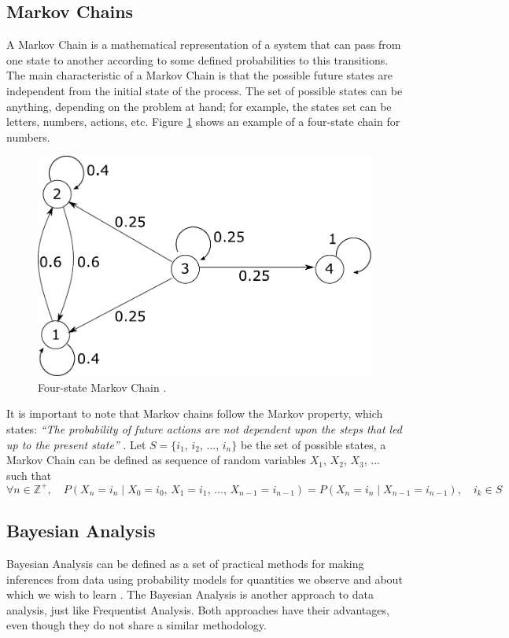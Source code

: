 	\subsection{Markov Chains}
	A Markov Chain is a mathematical representation of a system that can pass from one state to another according to some defined probabilities to this transitions. The main characteristic of a Markov Chain is that the possible future states are independent from the initial state of the process. The set of possible states can be anything, depending on the problem at hand; for example, the states set can be letters, numbers, actions, etc. Figure \ref{img:markov} shows an example of a four-state chain for numbers.
    \begin{figure}[H]
        \centering
        \includegraphics[scale=0.45]{files/Markov.pdf}
        \caption{Four-state Markov Chain \cite{brilliantMarkov}.}
        \label{img:markov}
    \end{figure}
    It is important to note that Markov chains follow the Markov property, which states: \textit{``The probability of future actions are not dependent upon the steps that led up to the present state''} \cite{brilliantMarkov}. Let $S=\{i_1$, $i_2$, $...$, $i_n\}$ be the set of possible states, a Markov Chain can be defined as sequence of random variables $X_1$, $X_2$, $X_3$, $...$ such that
    \begin{equation}
    	\forall n\in \mathbb{Z^+}, \quad P(X_n = i_n \mid X_0 = i_0, \, X_1 = i_1, \, \dots, \, X_{n-1} = i_{n-1}) = P(X_n = i_n \mid X_{n-1} = i_{n-1}),\quad i_k\in S
    \end{equation}

  \subsection{Bayesian Analysis}
    Bayesian Analysis can be defined as a set of practical methods for making inferences from data using probability models for quantities we observe and about which we wish to learn \cite{gelman2013bayesian}. The Bayesian Analysis is another approach to data analysis, just like Frequentist Analysis. Both approaches have their advantages, even though they do not share a similar methodology.
